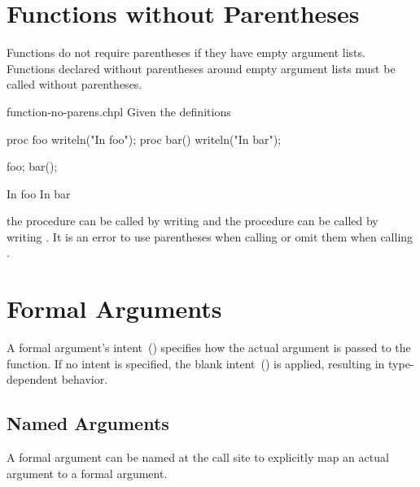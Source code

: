 \section{Functions without Parentheses}
\label{Functions_without_Parentheses}

Functions do not require parentheses if they have empty argument
lists.  Functions declared without parentheses around empty argument
lists must be called without parentheses.

\begin{chapelexample}{function-no-parens.chpl}
Given the definitions
\begin{chapel}
proc foo { writeln("In foo"); }
proc bar() { writeln("In bar"); }
\end{chapel}
\begin{chapelpost}
foo;
bar();
\end{chapelpost}
\begin{chapeloutput}
In foo
In bar
\end{chapeloutput}
the procedure  can be called by writing  and the
procedure  can be called by writing .  It is an
error to use parentheses when calling  or omit them
when calling .
\end{chapelexample}


\section{Formal Arguments}
\label{Formal_Arguments}

A formal argument's intent~() specifies how the
actual argument is passed to the function.  If no intent is specified,
the blank intent~() is applied, resulting in
type-dependent behavior.

\subsection{Named Arguments}
\label{Named_Arguments}

A formal argument can be named at the call site to explicitly map an
actual argument to a formal argument.


